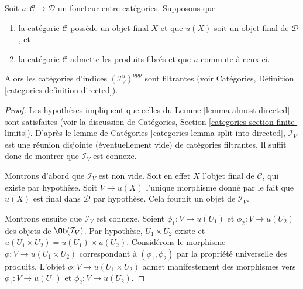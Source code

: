 \begin{lemma}
\label{lemma-directed}
Soit $u : \mathcal{C} \to \mathcal{D}$ un foncteur entre catégories.
Supposons que
\begin{enumerate}
\item la catégorie $\mathcal{C}$ possède un objet final $X$ et que
$u(X)$ soit un objet final de $\mathcal{D}$, et
\item la catégorie $\mathcal{C}$ admette les produits fibrés et que
$u$ commute à ceux-ci.
\end{enumerate}
Alors les catégories d’indices $(\mathcal{I}^u_V)^{opp}$ sont filtrantes (voir
Catégories, Définition \ref{categories-definition-directed}).
\end{lemma}

\begin{proof}
Les hypothèses impliquent que celles du
Lemme \ref{lemma-almost-directed}
sont satisfaites (voir la discussion de
Catégories, Section \ref{categories-section-finite-limits}).
D’après le
lemme de Catégories \ref{categories-lemma-split-into-directed},
$\mathcal{I}_V$ est une réunion disjointe (éventuellement vide) de
catégories filtrantes.
Il suffit donc de montrer que $\mathcal{I}_V$ est connexe.

\medskip\noindent
Montrons d’abord que $\mathcal{I}_V$ est non vide.
Soit en effet $X$ l’objet final de $\mathcal{C}$,
qui existe par hypothèse.
Soit $V \to u(X)$ l’unique morphisme donné par le fait
que $u(X)$ est final dans $\mathcal{D}$ par hypothèse.
Cela fournit un objet de $\mathcal{I}_V$.

\medskip\noindent
Montrons ensuite que $\mathcal{I}_V$ est connexe.
Soient $\phi_1 : V \to u(U_1)$ et $\phi_2 : V \to u(U_2)$
des objets de $\Ob(\mathcal{I}_V)$. Par hypothèse, $U_1\times U_2$
existe et $u(U_1\times U_2) = u(U_1)\times u(U_2)$.
Considérons le morphisme $\phi : V \to u(U_1\times U_2)$
correspondant à $(\phi_1, \phi_2)$ par la propriété universelle
des produits. L’objet $\phi : V \to u(U_1\times U_2)$
admet manifestement des morphismes vers $\phi_1 : V \to u(U_1)$ et $\phi_2 : V \to u(U_2)$.
\end{proof}

